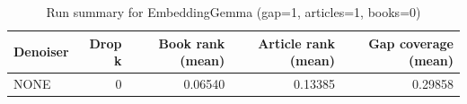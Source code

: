 \begin{table}
\caption{Run summary for EmbeddingGemma (gap=1, articles=1, books=0)}
\label{tab:summary_gap1_embeddinggemma_a1_b0}
\begin{tabular}{lrrrr}
\toprule
Denoiser & Drop k & Book rank (mean) & Article rank (mean) & Gap coverage (mean) \\
\midrule
NONE & 0 & 0.06540 & 0.13385 & 0.29858 \\
\bottomrule
\end{tabular}
\end{table}